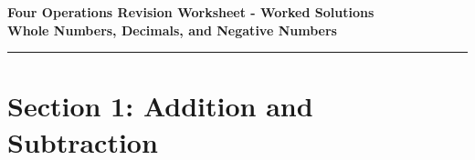 \documentclass[12pt,a4paper]{article}
\begin{document}
\begin{center}
    \vspace{2em}
    {\LARGE \textbf{Four Operations Revision Worksheet - Worked Solutions}} \\[0.5em]
    \vspace{1em}
    \textbf{Whole Numbers, Decimals, and Negative Numbers} \\[0.5em]
    \vspace{1em}
\end{center}

\hrule
\vspace{1em}

\section*{Section 1: Addition and Subtraction}
\end{document}
